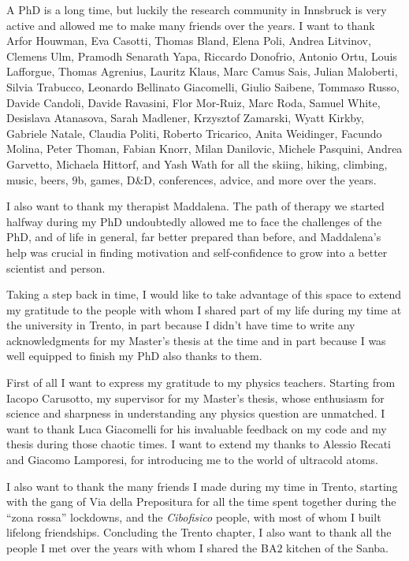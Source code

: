 A PhD is a long time, but luckily the research community in Innsbruck is very active and allowed me to make many friends over the years.  I want to thank  Arfor Houwman, Eva Casotti, Thomas Bland, Elena Poli, Andrea Litvinov, Clemens Ulm, Pramodh Senarath Yapa, Riccardo Donofrio, Antonio Ortu,  Louis Lafforgue, Thomas Agrenius,  Lauritz Klaus, Marc Camus Sais, Julian Maloberti, Silvia Trabucco, Leonardo Bellinato Giacomelli, Giulio Saibene, Tommaso Russo, Davide Candoli, Davide Ravasini, Flor Mor-Ruiz, Marc Roda, Samuel White,  Desislava Atanasova, Sarah Madlener, Krzysztof Zamarski, Wyatt Kirkby, Gabriele Natale, Claudia Politi, Roberto Tricarico, Anita Weidinger, Facundo Molina, Peter Thoman, Fabian Knorr, Milan Danilovic, Michele Pasquini, Andrea Garvetto, Michaela Hittorf, and Yash Wath for all the skiing, hiking, climbing, music, beers, $9$b, games, D\&D, conferences, advice, and more over the years.

I also want to thank my therapist Maddalena. The path of therapy we started halfway during my PhD undoubtedly allowed me to face the challenges of the PhD, and of life in general, far better prepared than before, and Maddalena's help was crucial in finding motivation and self-confidence to grow into a better scientist and person.

Taking a step back in time, I would like to take advantage of this space to extend my gratitude to the people with whom I shared part of my life during my time at the university in Trento, in part because I didn't have time to write any acknowledgments for my Master's thesis at the time and in part because I was well equipped to finish my PhD also thanks to them.

First of all I want to express my gratitude to my physics teachers. Starting from Iacopo Carusotto, my supervisor for my Master's thesis, whose enthusiasm for science and sharpness in understanding any physics question are unmatched. I want to thank Luca Giacomelli for his invaluable feedback on my code and my thesis during those chaotic times. I want to extend my thanks to Alessio Recati and Giacomo Lamporesi, for introducing me to the world of ultracold atoms.

I also want to thank the many friends I made during my time in Trento, starting with the gang of Via della Prepositura for all the time spent together during the ``zona rossa'' lockdowns, and the \textit{Cibofisico} people, with most of whom I built lifelong friendships. Concluding the Trento chapter, I also want to thank all the people I met over the years with whom I shared the BA$2$ kitchen of the Sanba.


